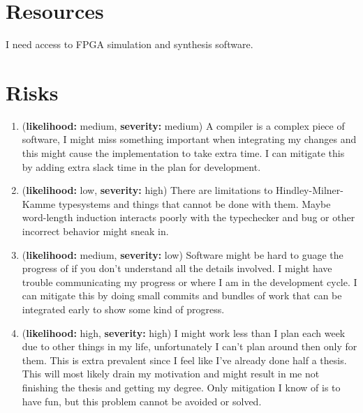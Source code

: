 \documentclass[msc,lith,english]{liuthesis}
\begin{document}
\section{Resources}
I need access to FPGA simulation and synthesis software.

\section{Risks}

\begin{enumerate}
  \item (\textbf{likelihood:} medium, \textbf{severity:} medium) A compiler is a complex piece of software, I might miss something important when integrating my changes and this might cause the implementation to take extra time. I can mitigate this by adding extra slack time in the plan for development.

  \item (\textbf{likelihood:} low, \textbf{severity:} high) There are limitations to Hindley-Milner-Kamme typesystems and things that cannot be done with them. Maybe word-length induction interacts poorly with the typechecker and bug or other incorrect behavior might sneak in.

  \item (\textbf{likelihood:} medium, \textbf{severity:} low) Software might be hard to guage the progress of if you don't understand all the details involved. I might have trouble communicating my progress or where I am in the development cycle. I can mitigate this by doing small commits and bundles of work that can be integrated early to show some kind of progress.

  \item (\textbf{likelihood:} high, \textbf{severity:} high) I might work less than I plan each week due to other things in my life, unfortunately I can't plan around then only for them. This is extra prevalent since I feel like I've already done half a thesis. This will most likely drain my motivation and might result in me not finishing the thesis and getting my degree. Only mitigation I know of is to have fun, but this problem cannot be avoided or solved.

\end{enumerate}

\printbibliography
\end{document}
